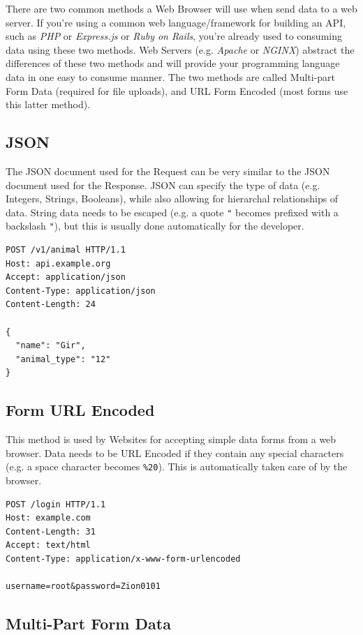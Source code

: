 \documentclass{book}
\begin{document}
There are two common methods a Web Browser will use when send data to a web server. If you're using a common web language/framework for building an API, such as \emph{PHP} or \emph{Express.js} or \emph{Ruby on Rails}, you're already used to consuming data using these two methods. Web Servers (e.g. \emph{Apache} or \emph{NGINX}) abstract the differences of these two methods and will provide your programming language data in one easy to consume manner. The two methods are called Multi-part Form Data (required for file uploads), and URL Form Encoded (most forms use this latter method).

\subsection{JSON}

The JSON document used for the Request can be very similar to the JSON document used for the Response. JSON can specify the type of data (e.g. Integers, Strings, Booleans), while also allowing for hierarchal relationships of data. String data needs to be escaped (e.g. a quote \texttt{"} becomes prefixed with a backslash \texttt{"}), but this is usually done automatically for the developer.

\begin{verbatim}
POST /v1/animal HTTP/1.1
Host: api.example.org
Accept: application/json
Content-Type: application/json
Content-Length: 24

{
  "name": "Gir",
  "animal_type": "12"
}
\end{verbatim}

\subsection{Form URL Encoded}

This method is used by Websites for accepting simple data forms from a web browser. Data needs to be URL Encoded if they contain any special characters (e.g. a space character becomes \texttt{\%20}). This is automatically taken care of by the browser.

\begin{verbatim}
POST /login HTTP/1.1
Host: example.com
Content-Length: 31
Accept: text/html
Content-Type: application/x-www-form-urlencoded

username=root&password=Zion0101
\end{verbatim}

\subsection{Multi-Part Form Data}
\end{document}
